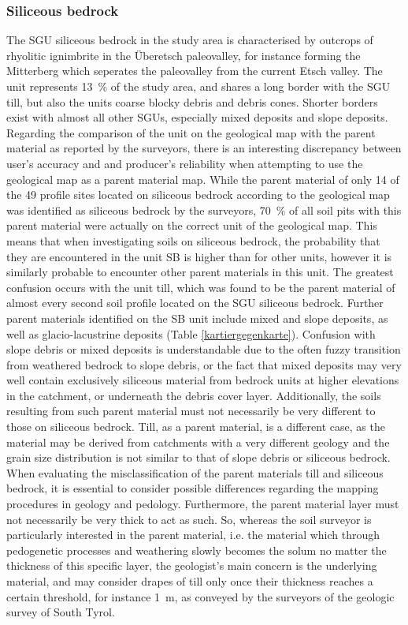 \documentclass[preprint,12pt,authoryear]{elsarticle}
\begin{document}
\subsubsection{Siliceous bedrock}
The SGU siliceous bedrock in the study area is characterised by outcrops of rhyolitic ignimbrite in the {\"U}beretsch paleovalley, for instance forming the Mitterberg which seperates the paleovalley from the current Etsch valley. The unit represents 13~\% of the study area, and shares a long border with the SGU till, but also the units coarse blocky debris and debris cones. Shorter borders exist with almost all other SGUs, especially mixed deposits and slope deposits. Regarding the comparison of the unit on the geological map with the parent material as reported by the surveyors, there is an interesting discrepancy between user's accuracy and and producer's reliability when attempting to use the geological map as a parent material map. While the parent material of only 14 of the 49 profile sites located on siliceous bedrock according to the geological map was identified as siliceous bedrock by the surveyors, 70~\% of all soil pits with this parent material were actually on the correct unit of the geological map. This means that when investigating soils on siliceous bedrock, the probability that they are encountered in the unit SB is higher than for other units, however it is similarly probable to encounter other parent materials in this unit. The greatest confusion occurs with the unit till, which was found to be the parent material of almost every second soil profile located on the SGU siliceous bedrock. Further parent materials identified on the SB unit include mixed and slope deposits, as well as glacio-lacustrine deposits (Table \ref{kartiergegenkarte}). Confusion with slope debris or mixed deposits is understandable due to the often fuzzy transition from  weathered bedrock to slope debris, or the fact that mixed deposits may very well contain exclusively siliceous material from bedrock units at higher elevations in the catchment, or underneath the debris cover layer. Additionally, the soils resulting from such parent material must not necessarily be very different to those on siliceous bedrock. Till, as a parent material, is a different case, as the material may be derived from catchments with a very different geology and the grain  size distribution is not similar to that of slope debris or siliceous bedrock. When evaluating the misclassification of the parent materials till and siliceous bedrock, it is essential to consider possible differences regarding the  mapping procedures in geology and pedology. Furthermore, the parent material layer must not necessarily be very thick to act as such. So, whereas the soil surveyor is particularly interested in the parent material, i.e. the material which through  pedogenetic processes and weathering slowly becomes the solum no matter the thickness of this specific layer, the geologist's main concern is the underlying material, and may consider drapes of till only once their thickness reaches a certain threshold, for instance 1~m, as conveyed by the surveyors of the geologic survey of South Tyrol.
\end{document}
